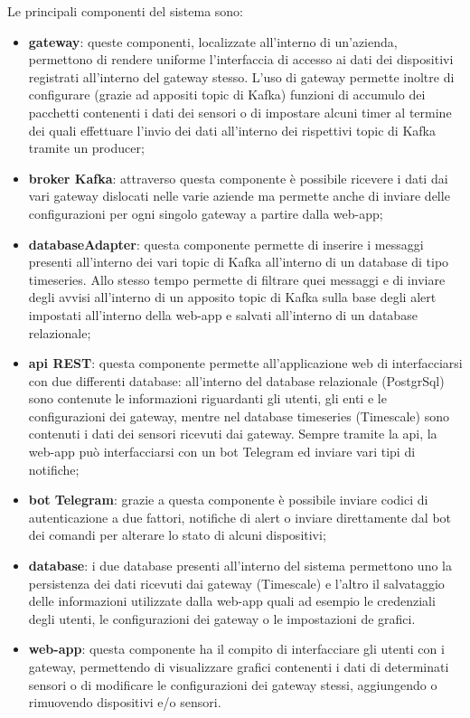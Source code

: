 		Le principali componenti del sistema sono:
		\begin{itemize}
		  	\item \textbf{gateway}: queste componenti, localizzate all'interno di un'azienda, permettono di rendere uniforme l'interfaccia di accesso ai dati dei dispositivi registrati all'interno del gateway stesso. L'uso di gateway permette inoltre di configurare (grazie ad appositi topic di Kafka) funzioni di accumulo dei pacchetti contenenti i dati dei sensori o di impostare alcuni timer al termine dei quali effettuare l'invio dei dati all'interno dei rispettivi topic di Kafka tramite un producer;
		  	\item \textbf{broker Kafka}: attraverso questa componente è possibile ricevere i dati dai vari gateway dislocati nelle varie aziende ma permette anche di inviare delle configurazioni per ogni singolo gateway a partire dalla web-app;
		  	\item \textbf{databaseAdapter}: questa componente permette di inserire i messaggi presenti all'interno dei vari topic di Kafka all'interno di un database di tipo timeseries. Allo stesso tempo permette di filtrare quei messaggi e di inviare degli avvisi all'interno di un apposito topic di Kafka sulla base degli alert impostati all'interno della web-app e salvati all'interno di un database relazionale;
		  	\item \textbf{api REST}: questa componente permette all'applicazione web di interfacciarsi con due differenti database: all'interno del database relazionale (PostgrSql) sono contenute le informazioni riguardanti gli utenti, gli enti e le configurazioni dei gateway, mentre nel database timeseries (Timescale) sono contenuti i dati dei sensori ricevuti dai gateway. Sempre tramite la api, la web-app può interfacciarsi con un bot Telegram ed inviare vari tipi di notifiche;
		  	\item \textbf{bot Telegram}: grazie a questa componente è possibile inviare codici di autenticazione a due fattori, notifiche di alert o inviare direttamente dal bot dei comandi per alterare lo stato di alcuni dispositivi;
		  	\item \textbf{database}: i due database presenti all'interno del sistema permettono uno la persistenza dei dati ricevuti dai gateway (Timescale) e l'altro il salvataggio delle informazioni utilizzate dalla web-app quali ad esempio le credenziali degli utenti, le configurazioni dei gateway o le impostazioni de grafici.
		  	\item \textbf{web-app}: questa componente ha il compito di interfacciare gli utenti con i gateway, permettendo di visualizzare grafici contenenti i dati di determinati sensori o di modificare le configurazioni dei gateway stessi, aggiungendo o rimuovendo dispositivi e/o sensori.    
		\end{itemize} 

